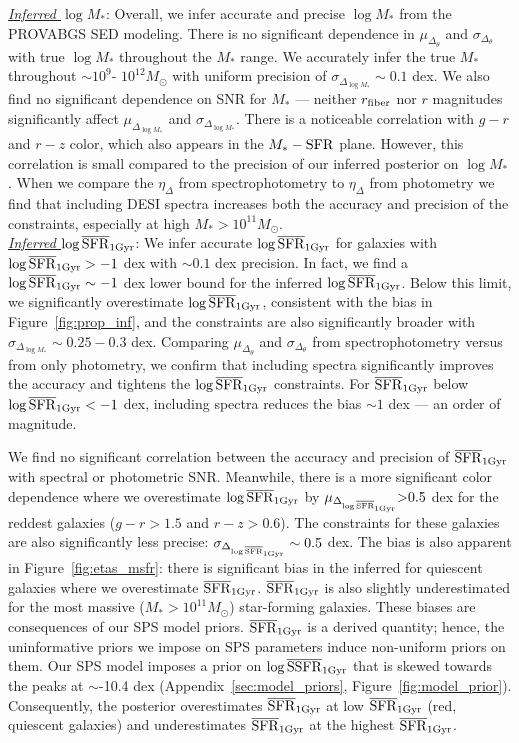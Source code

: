 \noindent \underline{\emph{Inferred $\log M_*$}}: 
Overall, we infer accurate and precise $\log M_*$ from the {\sc PROVABGS} SED
modeling. 
There is no significant dependence in $\mu_{\Delta_{\theta}}$ and
$\sigma_{\Delta_{\theta}}$ with true $\log M_*$ throughout the $M_*$ range. 
We accurately infer the true $M_*$ throughout ${\sim}10^{9}$- $10^{12} M_\odot$
with uniform precision of $\sigma_{\Delta_{\log M_*}}{\sim}0.1$ dex. 
We also find no significant dependence on SNR for $M_*$ --- neither $r_{\rm
fiber}$ nor $r$ magnitudes significantly affect $\mu_{\Delta_{\log M_*}}$ and
$\sigma_{\Delta_{\log M_*}}$.
There is a noticeable correlation with $g-r$ and $r-z$ color, which also
appears in the $M_*-{\rm SFR}$ plane. 
However, this correlation is small compared to the precision of our inferred
posterior on $\log M_*$. 
When we compare the $\eta_\Delta$ from spectrophotometry to $\eta_\Delta$ from
photometry we find that including DESI spectra increases both the accuracy and
precision of the constraints, especially at high $M_* > 10^{11}M_\odot$. \\

\noindent \underline{\emph{Inferred $\log\overline{\rm SFR}_{\rm 1Gyr}$}}: 
We infer accurate $\log\overline{\rm SFR}_{\rm 1Gyr}$ for galaxies with $\log\overline{\rm SFR}_{\rm 1Gyr} > -1$ dex with
${\sim} 0.1$ dex precision. 
In fact, we find a $\log \overline{\rm SFR}_{\rm 1Gyr} \sim -1$ dex lower bound for the inferred
$\log \overline{\rm SFR}_{\rm 1Gyr}$.
Below this limit, we significantly overestimate $\log \overline{\rm SFR}_{\rm 1Gyr}$, consistent with
the bias in Figure~\ref{fig:prop_inf}, and the constraints are also
significantly broader with $\sigma_{\Delta_{\log M_*}}{\sim}0.25 - 0.3$ dex.
Comparing $\mu_{\Delta_{\theta}}$ and $\sigma_{\Delta_{\theta}}$ from
spectrophotometry versus from only photometry, we confirm that including
spectra significantly improves the accuracy and tightens the $\log\overline{\rm SFR}_{\rm 1Gyr}$
constraints.
For $\overline{\rm SFR}_{\rm 1Gyr}$ below $\log\overline{\rm SFR}_{\rm 1Gyr} < -1$ dex, including spectra reduces the bias
${\sim}1$ dex --- an order of magnitude. 

We find no significant correlation between the accuracy and precision of
$\overline{\rm SFR}_{\rm 1Gyr}$ with spectral or photometric SNR.
Meanwhile, there is a more significant color dependence where we overestimate
$\log\overline{\rm SFR}_{\rm 1Gyr}$ by $\mu_{\Delta_{\log\overline{\rm SFR}_{\rm 1Gyr}}}{>}0.5$ dex for the reddest galaxies
($g-r > 1.5$ and $r-z> 0.6$).
The constraints for these galaxies are also significantly less precise:
$\sigma_{\Delta_{\log\overline{\rm SFR}_{\rm 1Gyr}}} \sim 0.5$ dex. 
The bias is also apparent in Figure~\ref{fig:etas_msfr}: there is significant
bias in the inferred for quiescent galaxies where we overestimate $\overline{\rm SFR}_{\rm 1Gyr}$. 
$\overline{\rm SFR}_{\rm 1Gyr}$ is also slightly underestimated for the most massive ($M_* >
10^{11}M_\odot$) star-forming galaxies. 
These biases are consequences of our SPS model priors.
$\overline{\rm SFR}_{\rm 1Gyr}$ is a derived quantity; hence, the uninformative priors we impose on
SPS parameters induce non-uniform priors on them.
Our SPS model imposes a prior on $\log \overline{\rm SSFR}_{\rm 1 Gyr}$
that is skewed towards the peaks at $\sim$-10.4 dex
(Appendix~\ref{sec:model_priors}, Figure~\ref{fig:model_prior}). 
Consequently, the posterior overestimates $\overline{\rm SFR}_{\rm 1Gyr}$ at low $\overline{\rm SFR}_{\rm 1Gyr}$ (red,
quiescent galaxies) and underestimates $\overline{\rm SFR}_{\rm 1Gyr}$ at the highest $\overline{\rm SFR}_{\rm 1Gyr}$. \\

